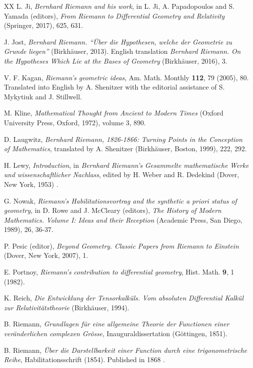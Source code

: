 \documentclass[12pt]{article}
\begin{document}
\begin{thebibliography}{XX}
L. Ji, {\it Bernhard Riemann and his work}, in L. Ji, A. Papadopoulos and S. Yamada (editors), {\it From Riemann to Differential Geometry and Relativity} (Springer, 2017), 625, 631.

J. Jost, {\it Bernhard Riemann. ``\"Uber die Hypothesen, welche der Geometrie zu Grunde liegen''} (Birkh\"auser, 2013). English translation {\it Bernhard Riemann. On the Hypotheses Which Lie at the Bases of Geometry} (Birkh\"auser, 2016), 3.

V. F. Kagan, {\it Riemann's geometric ideas}, Am. Math. Monthly {\bf 112}, 79 (2005), 80. Translated into English by A. Shenitzer with the editorial assistance of S. Mykytiuk and J. Stillwell.

M. Kline, {\it Mathematical Thought from Ancient to Modern Times} (Oxford University Press, Oxford, 1972), volume 3, 890.

D. Laugwitz, {\it Bernhard Riemann, 1826-1866: Turning Points in the Conception of Mathematics}, translated by A. Shenitzer (Birkh\"auser, Boston, 1999), 222, 292.

H. Lewy, {\it Introduction}, in {\it Bernhard Riemann's Gesammelte mathematische Werke und wissenschaftlicher Nachlass}, edited by H. Weber and R. Dedekind (Dover, New York, 1953) \cite{Riemann1953}.

G. Nowak, {\it Riemann's {\it Habilitationsvortrag} and the synthetic {\it a priori} status of geometry}, in D. Rowe and J. McCleary (editors), {\it The History of Modern Mathematics. Volume I: Ideas and their Reception} (Academic Press, San Diego, 1989), 26, 36-37.

P. Pesic (editor), {\it Beyond Geometry. Classic Papers from Riemann to Einstein} (Dover, New York, 2007), 1.

E. Portnoy, {\it Riemann's contribution to differential geometry}, Hist. Math. {\bf 9}, 1 (1982). %

K. Reich, {\it Die Entwicklung der Tensorkalk\"uls. Vom absoluten Differential Kalk\"ul zur Relativit\"atstheorie} (Birkh\"auser, 1994). %

B. Riemann, {\it Grundlagen f\"ur eine allgemeine Theorie der Functionen einer ver\"anderlichen complexen Gr\"osse}, Inaugural\-dissertation (G\"ottingen, 1851).

B. Riemann, {\it \"Uber die Darstellbarkeit einer Function durch eine trigono\-metrische Reihe}, Habilitationsschrift (1854). Published in 1868 \cite{Riemann1868a}.


\end{thebibliography}
\end{document}
